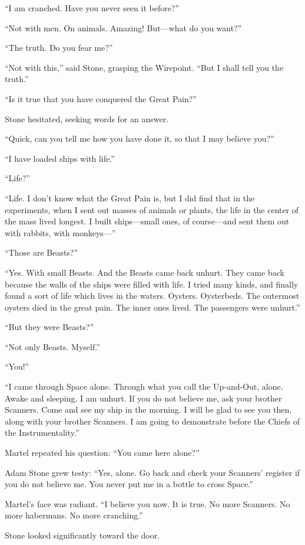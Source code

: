 ``I am cranched. Have you never seen it before?''

``Not with men. On animals. Amazing! But---what do you want?''

``The truth. Do you fear me?''

``Not with this,'' said Stone, grasping the Wirepoint. ``But I shall tell you the truth.''

``Is it true that you have conquered the Great Pain?''

Stone hesitated, seeking words for an answer.

``Quick, can you tell me how you have done it, so that I may believe you?''

``I have loaded ships with life.''

``Life?''

``Life. I don't know what the Great Pain is, but I did find that in the experiments, when I sent out masses of animals or plants, the life in the center of the mass lived longest. I built ships---small ones, of course---and sent them out with rabbits, with monkeys---''

``Those are Beasts?''

``Yes. With small Beasts. And the Beasts came back unhurt. They came back because the walls of the ships were filled with life. I tried many kinds, and finally found a sort of life which lives in the waters. Oysters. Oysterbeds. The outermost oysters died in the great pain. The inner ones lived. The passengers were unhurt.''

``But they were Beasts?''

``Not only Beasts. Myself.''

``You!''

``I came through Space alone. Through what you call the Up-and-Out, alone. Awake and sleeping. I am unhurt. If you do not believe me, ask your brother Scanners. Come and see my ship in the morning. I will be glad to see you then, along with your brother Scanners. I am going to demonstrate before the Chiefs of the Instrumentality.''

Martel repeated his question: ``You came here alone?''

Adam Stone grew testy: ``Yes, alone. Go back and check your Scanners' register if you do not believe me. You never put me in a bottle to cross Space.''

Martel's face was radiant. ``I believe you now. It is true. No more Scanners. No more habermans. No more cranching.''

Stone looked significantly toward the door.

